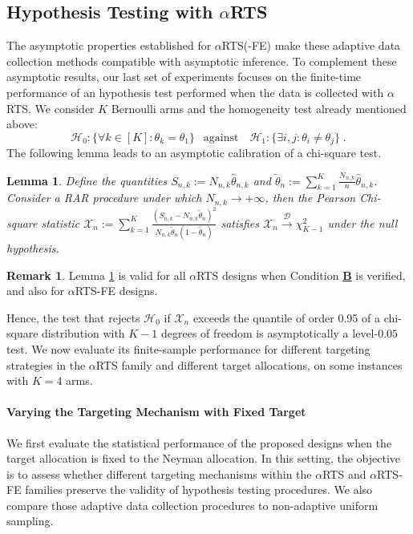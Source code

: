 \documentclass[11pt]{article}
\theoremstyle{plain}
\newtheorem{lemma}[theorem]{Lemma}
\theoremstyle{definition}
\newtheorem{remark}[theorem]{Remark}
\begin{document}
\subsection{Hypothesis Testing with $\alpha$RTS} The asymptotic properties established for $\alpha$RTS(-FE) make these adaptive data collection methods compatible with asymptotic inference. To complement these asymptotic results, our last set of experiments focuses on the finite-time performance of an hypothesis test performed when the data is collected with $\alpha$RTS. We consider $K$ Bernoulli arms and the homogeneity test already mentioned above:
\[\mathcal{H}_0 : \{\forall k \in [K] : \theta_k = \theta_1 \} \ \ \text{ against } \ \ \ \mathcal{H}_1 : \{\exists i,j :  \theta_i \neq \theta_j\}\;.\]
The following lemma leads to an asymptotic calibration of a chi-square test.

\begin{lemma}\label{lem:pearson}
		Define the quantities \(S_{n,k} := N_{n,k} \hat{\theta}_{n,k}\) and 
		\(\tilde{\theta}_n := \sum_{k=1}^K \frac{N_{n,k}}{n} \hat{\theta}_{n,k}\).	
		Consider a RAR procedure under which \(N_{n,k} \to +\infty\), then the Pearson Chi-square statistic \(\mathcal{X}_n := \sum_{k=1}^K \frac{\left(S_{n,k} - N_{n,k}\tilde{\theta}_n\right)^2}{N_{n,k}\tilde{\theta}_n (1 - \tilde{\theta}_n)}\)
		satisfies
		\(\mathcal{X}_n \xrightarrow{\mathcal{D}} \chi^2_{K-1}\) under the null hypothesis.
	\end{lemma}
	\begin{remark}
		Lemma \ref{lem:pearson} is valid for all \(\alpha\)RTS designs when Condition \hyperlink{CB}{\textbf{B}} is verified, and also for \(\alpha\)RTS-FE designs.
\end{remark}

{Hence, the test that rejects $\mathcal{H}_0$ if $\mathcal{X}_n$ exceeds the quantile of order 0.95 of a chi-square distribution with $K-1$ degrees of freedom is asymptotically a level-$0.05$ test.} We now evaluate its finite-sample performance for different targeting strategies in the $\alpha$RTS family and different target allocations, on some instances with $K=4$ arms.


\paragraph*{Varying the Targeting Mechanism with Fixed Target}
We first evaluate the statistical performance of the proposed designs when the target allocation is fixed to the Neyman allocation. In this setting, the objective is to assess whether different targeting mechanisms within the $\alpha$RTS and $\alpha$RTS-FE families preserve the validity of hypothesis testing procedures. We also compare those adaptive data collection procedures to non-adaptive uniform sampling. 
\end{document}
